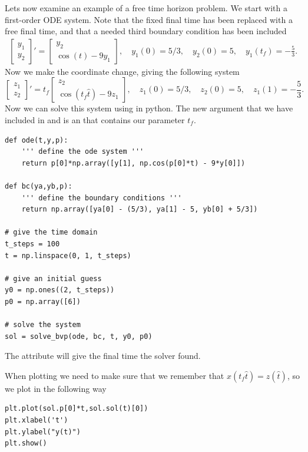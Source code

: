 Lets now examine an example of a free time horizon problem.
We start with a first-order ODE system. Note that the fixed final time has been replaced with a free final time, and that a needed third boundary condition has been included
\begin{align*}
    \begin{bmatrix}
        y_1\\y_2
    \end{bmatrix}'
    =
    \begin{bmatrix}
        y_2 \\
        \cos(t) - 9y_1
    \end{bmatrix},
    \quad y_1(0) = 5/3,\quad y_2(0) = 5,\quad y_1(t_f) = -\frac{5}{3}.
\end{align*}
Now we make the coordinate change, giving the following system
\begin{equation}\label{ex:bvp2}
    \begin{bmatrix}
        z_1\\z_2
    \end{bmatrix}'
    =
    t_f\begin{bmatrix}
        z_2 \\
        \cos( t_f \hat{t}) - 9z_1
    \end{bmatrix},
    \quad z_1(0) = 5/3,\quad z_2(0) = 5,\quad z_1(1) = -\frac{5}{3}.
\end{equation}
Now we can solve this system using  in python.
The new argument  that we have included in  and  is an  that contains our parameter $t_f$.

\begin{lstlisting}
def ode(t,y,p):
    ''' define the ode system '''
    return p[0]*np.array([y[1], np.cos(p[0]*t) - 9*y[0]])

def bc(ya,yb,p):
    ''' define the boundary conditions '''
    return np.array([ya[0] - (5/3), ya[1] - 5, yb[0] + 5/3])

# give the time domain
t_steps = 100
t = np.linspace(0, 1, t_steps)

# give an initial guess
y0 = np.ones((2, t_steps))
p0 = np.array([6])

# solve the system
sol = solve_bvp(ode, bc, t, y0, p0)
\end{lstlisting}
The attribute  will give the final time the solver found.

When plotting we need to make sure that we remember that $x(t_f\hat{t}) = z(\hat{t})$, so we plot in the following way
\begin{lstlisting}
plt.plot(sol.p[0]*t,sol.sol(t)[0])
plt.xlabel('t')
plt.ylabel("y(t)")
plt.show()
\end{lstlisting}


